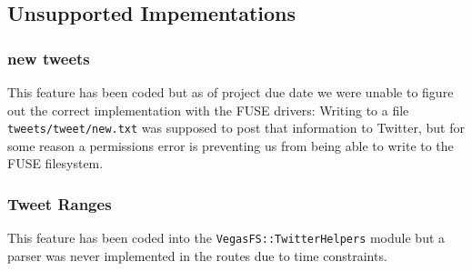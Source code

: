 \subsection{Unsupported Impementations}
\subsubsection{new tweets}
This feature has been coded but as of project due date we were unable to figure out the correct implementation with the FUSE drivers: Writing to a file \texttt{tweets/tweet/new.txt} was supposed to post that information to Twitter, but for some reason a permissions error is preventing us from being able to write to the FUSE filesystem.
\subsubsection{Tweet Ranges}
This feature has been coded into the \texttt{VegasFS::TwitterHelpers} module but a parser was never implemented in the routes due to time constraints.

